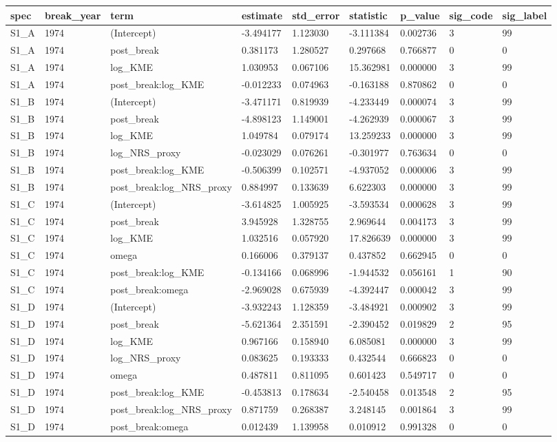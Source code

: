 \begin{tabular}{lllllllll}
\hline
spec & break\_year & term & estimate & std\_error & statistic & p\_value & sig\_code & sig\_label \\
\hline
S1\_A & 1974 & (Intercept) & -3.494177 & 1.123030 & -3.111384 & 0.002736 & 3 & 99 \\
S1\_A & 1974 & post\_break & 0.381173 & 1.280527 & 0.297668 & 0.766877 & 0 & 0 \\
S1\_A & 1974 & log\_KME & 1.030953 & 0.067106 & 15.362981 & 0.000000 & 3 & 99 \\
S1\_A & 1974 & post\_break:log\_KME & -0.012233 & 0.074963 & -0.163188 & 0.870862 & 0 & 0 \\
S1\_B & 1974 & (Intercept) & -3.471171 & 0.819939 & -4.233449 & 0.000074 & 3 & 99 \\
S1\_B & 1974 & post\_break & -4.898123 & 1.149001 & -4.262939 & 0.000067 & 3 & 99 \\
S1\_B & 1974 & log\_KME & 1.049784 & 0.079174 & 13.259233 & 0.000000 & 3 & 99 \\
S1\_B & 1974 & log\_NRS\_proxy & -0.023029 & 0.076261 & -0.301977 & 0.763634 & 0 & 0 \\
S1\_B & 1974 & post\_break:log\_KME & -0.506399 & 0.102571 & -4.937052 & 0.000006 & 3 & 99 \\
S1\_B & 1974 & post\_break:log\_NRS\_proxy & 0.884997 & 0.133639 & 6.622303 & 0.000000 & 3 & 99 \\
S1\_C & 1974 & (Intercept) & -3.614825 & 1.005925 & -3.593534 & 0.000628 & 3 & 99 \\
S1\_C & 1974 & post\_break & 3.945928 & 1.328755 & 2.969644 & 0.004173 & 3 & 99 \\
S1\_C & 1974 & log\_KME & 1.032516 & 0.057920 & 17.826639 & 0.000000 & 3 & 99 \\
S1\_C & 1974 & omega & 0.166006 & 0.379137 & 0.437852 & 0.662945 & 0 & 0 \\
S1\_C & 1974 & post\_break:log\_KME & -0.134166 & 0.068996 & -1.944532 & 0.056161 & 1 & 90 \\
S1\_C & 1974 & post\_break:omega & -2.969028 & 0.675939 & -4.392447 & 0.000042 & 3 & 99 \\
S1\_D & 1974 & (Intercept) & -3.932243 & 1.128359 & -3.484921 & 0.000902 & 3 & 99 \\
S1\_D & 1974 & post\_break & -5.621364 & 2.351591 & -2.390452 & 0.019829 & 2 & 95 \\
S1\_D & 1974 & log\_KME & 0.967166 & 0.158940 & 6.085081 & 0.000000 & 3 & 99 \\
S1\_D & 1974 & log\_NRS\_proxy & 0.083625 & 0.193333 & 0.432544 & 0.666823 & 0 & 0 \\
S1\_D & 1974 & omega & 0.487811 & 0.811095 & 0.601423 & 0.549717 & 0 & 0 \\
S1\_D & 1974 & post\_break:log\_KME & -0.453813 & 0.178634 & -2.540458 & 0.013548 & 2 & 95 \\
S1\_D & 1974 & post\_break:log\_NRS\_proxy & 0.871759 & 0.268387 & 3.248145 & 0.001864 & 3 & 99 \\
S1\_D & 1974 & post\_break:omega & 0.012439 & 1.139958 & 0.010912 & 0.991328 & 0 & 0 \\
\hline
\end{tabular}
